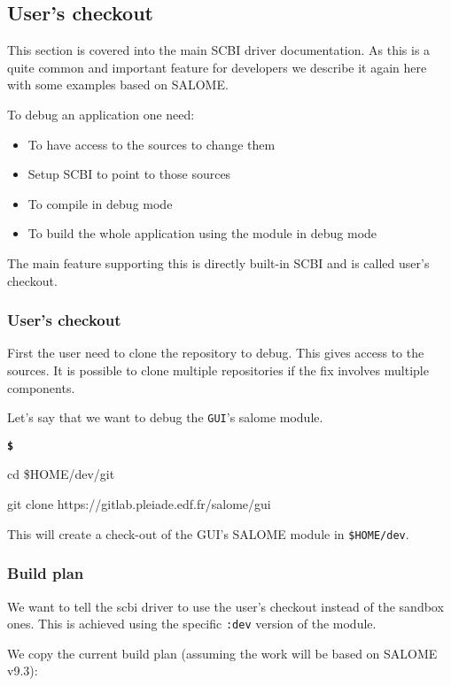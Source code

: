 \documentclass[a4paper,12pt,twoside]{article}
\newenvironment{shellcommand}{
	\begin{list}{ %
			\bfseries\texttt \$
		}{ %
			\ttfamily
			\setlength{\topsep}{-0.3ex}
			\setlength{\labelwidth}{1in}
			\setlength{\leftmargin}{0.7in}
			\setlength{\labelsep}{0.5ex}
			\setlength{\rightmargin}{0.5in}
			\setlength{\itemsep}{1ex}
			\setlength{\parsep}{0ex}
			\setlength{\listparindent}{0.5in}
		}
	}{
	\end{list}
}
\newcommand{\code}[1]{\texttt{#1}}
\begin{document}
\subsection{User's checkout}

This section is covered into the main SCBI driver documentation. As this is a quite common and important feature for developers we describe it again here with some examples based on SALOME.

To debug an application one need:

\begin{itemize}
	\item To have access to the sources to change them
	\item Setup SCBI to point to those sources
	\item To compile in debug mode
	\item To build the whole application using the module in debug mode
\end{itemize}

The main feature supporting this is directly built-in SCBI and is called user's checkout.

\subsubsection{User's checkout}
\label{user:checkout}
First the user need to clone the repository to debug. This gives access to the sources. It is possible to clone multiple repositories if the fix involves multiple components.

Let's say that we want to debug the \code{GUI}'s salome module.

\begin{shellcommand}
	\item cd \$HOME/dev/git
	\item git clone https://gitlab.pleiade.edf.fr/salome/gui
\end{shellcommand}

This will create a check-out of the GUI's SALOME module in \code{\$HOME/dev}.

\subsubsection{Build plan}

We want to tell the scbi driver to use the user's checkout instead of the sandbox ones. This is achieved using the specific \code{:dev} version of the module.

We copy the current build plan (assuming the work will be based on SALOME v9.3):
\end{document}
